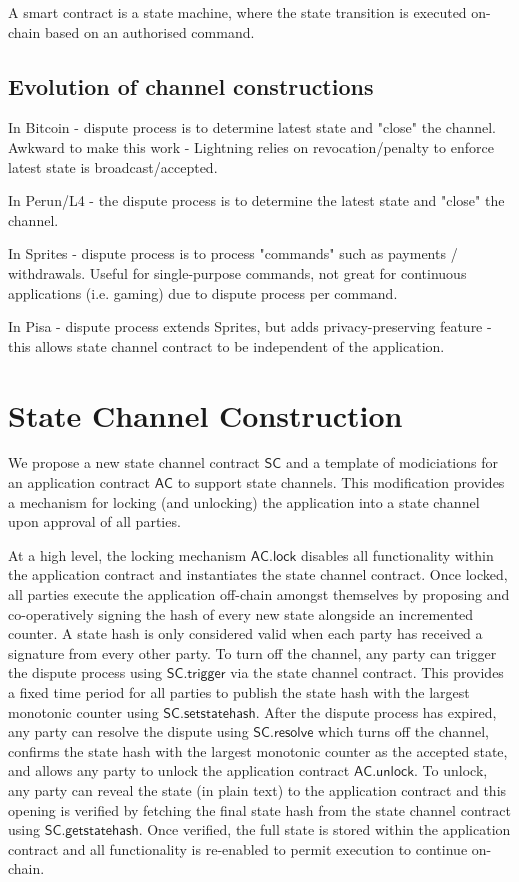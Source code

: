 \documentclass{llncs}
\newcommand{\statechannel}{\mathsf{SC}}
\newcommand{\statechanneldispute}{\mathsf{SC}.\mathsf{trigger}}
\newcommand{\statechannelsetstate}{\mathsf{SC}.\mathsf{setstatehash}}
\newcommand{\statechannelresolve}{\mathsf{SC}.\mathsf{resolve}}
\newcommand{\statechannelgetcommitment}{\mathsf{SC}.\mathsf{getstatehash}}
\newcommand{\appcontract}{\mathsf{AC}}
\newcommand{\applock}{\mathsf{AC.lock}}
\newcommand{\appunlock}{\mathsf{AC.unlock}}
\begin{document}
A smart contract is a state machine, where the state transition is executed on-chain based on an authorised command. 


\subsection{Evolution of channel constructions}

In Bitcoin - dispute process is to determine latest state and "close" the channel. Awkward to make this work - Lightning relies on revocation/penalty to enforce latest state is broadcast/accepted. 

In Perun/L4 - the dispute process is to determine the latest state and "close" the channel. 

In Sprites - dispute process is to process "commands" such as payments / withdrawals. Useful for single-purpose commands, not great for continuous applications (i.e. gaming) due to dispute process per command.

In Pisa - dispute process extends Sprites, but adds privacy-preserving feature - this allows state channel contract to be independent of the application. 

\section{State Channel Construction} 

We propose a new state channel contract $\statechannel$ and a template of modiciations for an application contract $\appcontract$  to support state channels. 
This modification provides a mechanism for locking (and unlocking) the application into a state channel upon approval of all parties. 

At a high level, the locking mechanism $\applock$ disables all functionality within the application contract and instantiates the state channel contract. 
Once locked, all parties execute the application off-chain amongst themselves by proposing  and co-operatively signing the hash of every new state alongside an incremented counter. 
A state hash is only considered valid when each party has received a signature from every other party. 
To turn off the channel, any party can trigger the dispute process using $\statechanneldispute$ via the state channel contract.
This provides  a fixed time period  for all parties to publish the state hash with the largest monotonic counter using $\statechannelsetstate$. 
After the dispute process has expired, any party can resolve the dispute using $\statechannelresolve$ which turns off the channel, confirms the state hash with the largest monotonic counter as the accepted state, and allows any party to unlock the application contract $\appunlock$. 
To unlock, any party can reveal the state (in plain text) to the application contract and this opening is verified by fetching the final state hash from the state channel contract using  $\statechannelgetcommitment$. 
Once verified, the full state is stored within the application contract and all functionality is re-enabled to permit execution to continue on-chain. 
\end{document}
